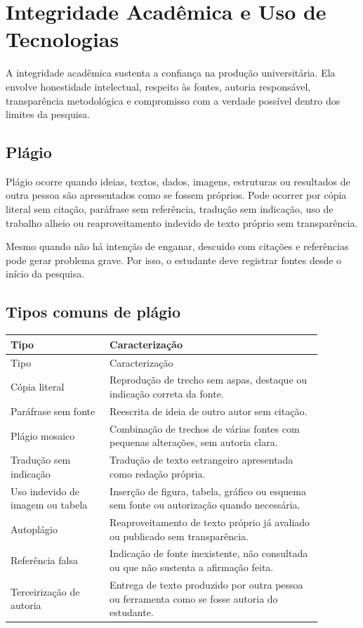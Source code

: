 \chapter{Integridade Acadêmica e Uso de Tecnologias}
\label{chap:integridade}

A integridade acadêmica sustenta a confiança na produção universitária. Ela envolve honestidade intelectual, respeito às fontes, autoria responsável, transparência metodológica e compromisso com a verdade possível dentro dos limites da pesquisa.

\section{Plágio}

Plágio ocorre quando ideias, textos, dados, imagens, estruturas ou resultados de outra pessoa são apresentados como se fossem próprios. Pode ocorrer por cópia literal sem citação, paráfrase sem referência, tradução sem indicação, uso de trabalho alheio ou reaproveitamento indevido de texto próprio sem transparência.

Mesmo quando não há intenção de enganar, descuido com citações e referências pode gerar problema grave. Por isso, o estudante deve registrar fontes desde o início da pesquisa.

\section{Tipos comuns de plágio}

\begin{longtable}{p{0.28\linewidth}p{0.60\linewidth}}
\toprule
Tipo & Caracterização \\
\midrule
\endfirsthead
\toprule
Tipo & Caracterização \\
\midrule
\endhead
Cópia literal & Reprodução de trecho sem aspas, destaque ou indicação correta da fonte. \\
Paráfrase sem fonte & Reescrita de ideia de outro autor sem citação. \\
Plágio mosaico & Combinação de trechos de várias fontes com pequenas alterações, sem autoria clara. \\
Tradução sem indicação & Tradução de texto estrangeiro apresentada como redação própria. \\
Uso indevido de imagem ou tabela & Inserção de figura, tabela, gráfico ou esquema sem fonte ou autorização quando necessária. \\
Autoplágio & Reaproveitamento de texto próprio já avaliado ou publicado sem transparência. \\
Referência falsa & Indicação de fonte inexistente, não consultada ou que não sustenta a afirmação feita. \\
Terceirização de autoria & Entrega de texto produzido por outra pessoa ou ferramenta como se fosse autoria do estudante. \\
\bottomrule
\end{longtable}

